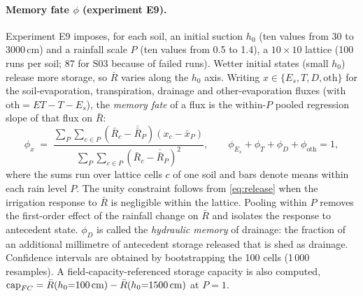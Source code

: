 \paragraph{Memory fate $\phi$ (experiment E9).}
Experiment E9 imposes, for each soil, an initial suction $h_0$ (ten values from 30 to 3000\,cm) and a rainfall scale $P$ (ten values from 0.5 to 1.4), a $10\times10$ lattice (100 runs per soil; 87 for S03 because of failed runs). Wetter initial states (small $h_0$) release more storage, so $\bar R$ varies along the $h_0$ axis. Writing $x\in\{E_s,T,D,\text{oth}\}$ for the soil-evaporation, transpiration, drainage and other-evaporation fluxes (with $\text{oth}=\mathit{ET}-T-E_s$), the \emph{memory fate} of a flux is the within-$P$ pooled regression slope of that flux on $\bar R$:
\begin{equation}
\phi_x \;=\; \frac{\sum_{P}\sum_{c\in P}(\bar R_c-\overline{\bar R}_P)(x_c-\bar x_P)}{\sum_{P}\sum_{c\in P}(\bar R_c-\overline{\bar R}_P)^2},\qquad \phi_{E_s}+\phi_T+\phi_D+\phi_{\mathrm{oth}}=1 ,
\label{eq:phi}
\end{equation}
where the sums run over lattice cells $c$ of one soil and bars denote means within each rain level $P$. The unity constraint follows from \cref{eq:release} when the irrigation response to $\bar R$ is negligible within the lattice. Pooling within $P$ removes the first-order effect of the rainfall change on $\bar R$ and isolates the response to antecedent state. $\phi_D$ is called the \emph{hydraulic memory} of drainage: the fraction of an additional millimetre of antecedent storage released that is shed as drainage. Confidence intervals are obtained by bootstrapping the 100 cells (1\,000 resamples). A field-capacity-referenced storage capacity is also computed, $\mathrm{cap}_{FC}=\bar R(h_0{=}100\text{\,cm})-\bar R(h_0{=}1500\text{\,cm})$ at $P=1$.

